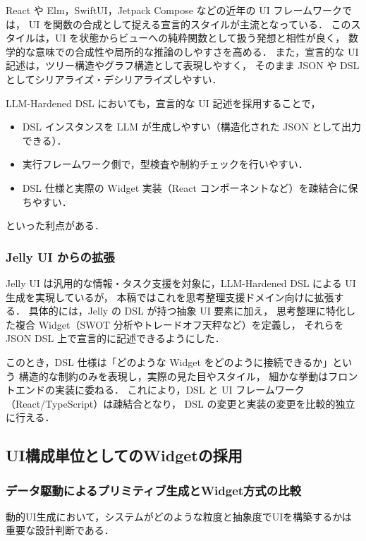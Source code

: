 \documentclass[a4paper,10pt]{jarticle}
\begin{document}
React や Elm，SwiftUI，Jetpack Compose などの近年の UI フレームワークでは，
UI を関数の合成として捉える宣言的スタイルが主流となっている．
このスタイルは，UI を状態からビューへの純粋関数として扱う発想と相性が良く，
数学的な意味での合成性や局所的な推論のしやすさを高める．
また，宣言的な UI 記述は，ツリー構造やグラフ構造として表現しやすく，
そのまま JSON や DSL としてシリアライズ・デシリアライズしやすい．

LLM-Hardened DSL においても，宣言的な UI 記述を採用することで，
\begin{itemize}
  \item DSL インスタンスを LLM が生成しやすい（構造化された JSON として出力できる）．
  \item 実行フレームワーク側で，型検査や制約チェックを行いやすい．
  \item DSL 仕様と実際の Widget 実装（React コンポーネントなど）を疎結合に保ちやすい．
\end{itemize}
といった利点がある．

\subsubsection{Jelly UI からの拡張}

Jelly UI は汎用的な情報・タスク支援を対象に，LLM-Hardened DSL による UI 生成を実現しているが，
本稿ではこれを思考整理支援ドメイン向けに拡張する．
具体的には，Jelly の DSL が持つ抽象 UI 要素に加え，
思考整理に特化した複合 Widget（SWOT 分析やトレードオフ天秤など）を定義し，
それらを JSON DSL 上で宣言的に記述できるようにした．

このとき，DSL 仕様は「どのような Widget をどのように接続できるか」という
構造的な制約のみを表現し，実際の見た目やスタイル，
細かな挙動はフロントエンドの実装に委ねる．
これにより，DSL と UI フレームワーク（React/TypeScript）は疎結合となり，
DSL の変更と実装の変更を比較的独立に行える．

\subsection{UI構成単位としてのWidgetの採用}
\label{subsec:why_widget}

\subsubsection{データ駆動によるプリミティブ生成とWidget方式の比較}
動的UI生成において，システムがどのような粒度と抽象度でUIを構築するかは重要な設計判断である．
\end{document}
